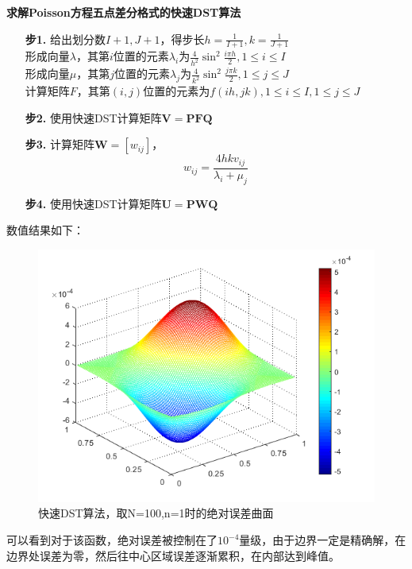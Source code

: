 \documentclass[fontset=mac]{ctexart}
\begin{document}
	\textbf{求解Poisson方程五点差分格式的快速DST算法}
	\begin{enumerate}
		\item[\textbf{步1.}] 给出划分数$I+1,J+1$，得步长$h = \frac{1}{I+1}, k = \frac{1}{J+1}$\\
		形成向量$\lambda$，其第$i$位置的元素$\lambda_i$为$\frac{4}{h^2} \sin^2 \frac{i \pi h}{2},1 \le i \le I$\\
		形成向量$\mu$，其第$j$位置的元素$\lambda_j$为$\frac{4}{k^2} \sin^2 \frac{j \pi k}{2},1 \le j \le J$\\
		计算矩阵$F$，其第$(i,j)$位置的元素为$f(ih,jk),1\le i \le I, 1 \le j \le J$
		\item[\textbf{步2.}] 使用快速DST计算矩阵$\mathbf{V} = \mathbf{PFQ}$
		\item[\textbf{步3.}] 计算矩阵$\mathbf{W} = [w_{ij}]$，
		$$
		w_{i j}=\frac{4 h k v_{i j}}{\lambda_{i}+\mu_{j}}
		$$
		\item[\textbf{步4.}] 使用快速DST计算矩阵$\mathbf{U} = \mathbf{PWQ}$
	\end{enumerate}
	数值结果如下：
	\begin{figure}[H]
		\centering
		\includegraphics[width=0.7\linewidth]{fig/dst}
		\caption{快速DST算法，取N=100,n=1时的绝对误差曲面}
	\end{figure}
	可以看到对于该函数，绝对误差被控制在了$10^{-4}$量级，由于边界一定是精确解，在边界处误差为零，然后往中心区域误差逐渐累积，在内部达到峰值。
\end{document}
